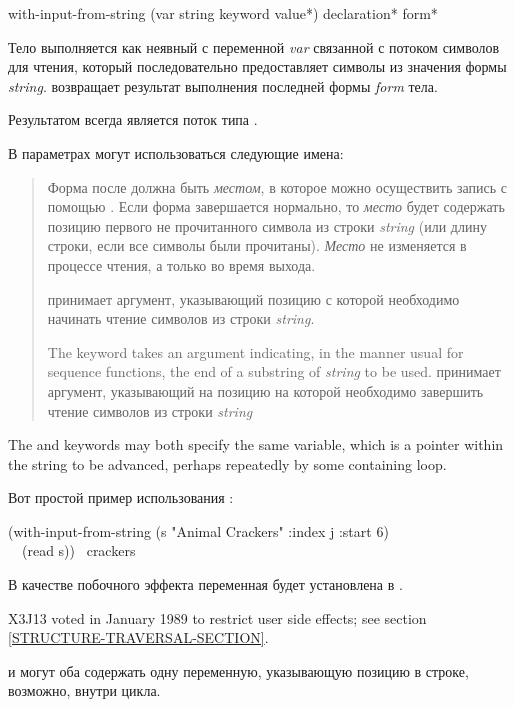 \begin{defmac}
with-input-from-string (var string {keyword value}*)
      {declaration}* {form}*

Тело выполняется как неявный  с переменной \emph{var} связанной с
потоком символов для чтения, который последовательно предоставляет символы из
значения формы \emph{string}.  возвращает результат
выполнения последней формы \emph{form} тела.

Результатом  всегда является поток типа
.

В параметрах могут использоваться следующие имена:
\begin{quotation}
  \begin{flushdesc}
  \item[\cd{:index}]
    Форма после  должна быть \emph{местом}, в которое можно осуществить
    запись с помощью . Если форма  завершается
    нормально, то \emph{место} будет содержать позицию первого не прочитанного
    символа из строки \emph{string} (или длину строки, если все символы были
    прочитаны).
    \emph{Место} не изменяется в процессе чтения, а только во время выхода.

  \item[\cd{:start}]
     принимает аргумент, указывающий позицию с которой
    необходимо начинать чтение символов из строки \emph{string}.

  \item[\cd{:end}]
    The  keyword takes an argument indicating, in the manner
    usual for sequence functions, the end of
    a substring of \emph{string} to be used.
     принимает аргумент, указывающий на позицию на которой необходимо
    завершить чтение символов из строки \emph{string}

  \end{flushdesc}
\end{quotation}

The  and  keywords may both specify
the same variable, which is a pointer within the string to be advanced,
perhaps repeatedly by some containing loop.

Вот простой пример использования :
\begin{lisp}
(with-input-from-string (s "Animal Crackers" :index j :start 6) \\
~~(read s)) \EV\ crackers
\end{lisp}
В качестве побочного эффекта переменная  будет установлена в .

\begin{new}
X3J13 voted in January 1989
to restrict user side effects; see section \ref{STRUCTURE-TRAVERSAL-SECTION}.
\end{new}

 и  могут оба содержать одну переменную, указывающую
позицию в строке, возможно, внутри цикла.
\end{defmac}

